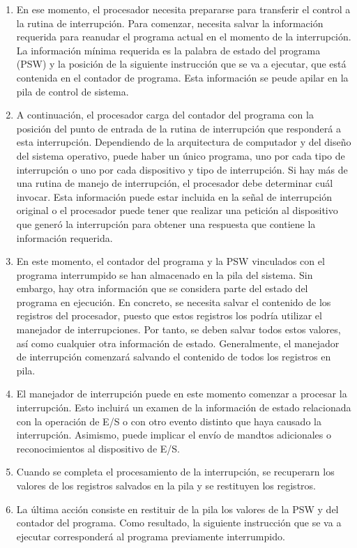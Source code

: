 \documentclass{article}
\begin{document}
\begin{itemize}
\begin{enumerate}
	\item En ese momento, el procesador necesita prepararse para transferir el control a la rutina de interrupción. Para comenzar, necesita salvar la información requerida para reanudar el programa actual en el momento de la interrupción. La información mínima requerida es la palabra de estado del programa (PSW) y la posición de la siguiente instrucción que se va a ejecutar, que está contenida en el contador de programa. Esta información se peude apilar en la pila de control de sistema.
	
	\item A continuación, el procesador carga del contador del programa con la posición del punto de entrada de la rutina de interrupción que responderá a esta interrupción. Dependiendo de la arquitectura de computador y del diseño del sistema operativo, puede haber un único programa, uno por cada tipo de interrupción o uno por cada dispositivo y tipo de interrupción. Si hay más de una rutina de manejo de interrupción, el procesador debe determinar cuál invocar. Esta información puede estar incluida en la señal de interrupción original o el procesador puede tener que realizar una petición al dispositivo que generó la interrupción para obtener una respuesta que contiene la información requerida.
	
	\item En este momento, el contador del programa y la PSW vinculados con el programa interrumpido se han almacenado en la pila del sistema. Sin embargo, hay otra información que se considera parte del estado del programa en ejecución. En concreto, se necesita salvar el contenido de los registros del procesador, puesto que estos registros los podría utilizar el manejador de interrupciones. Por tanto, se deben salvar todos estos valores, así como cualquier otra información de estado. Generalmente, el manejador de interrupción comenzará salvando el contenido de todos los registros en pila. 
	
	\item El manejador de interrupción puede en este momento comenzar a procesar la interrupción. Esto incluirá un examen de la información de estado relacionada con la operación de E/S o con otro evento distinto que haya causado la interrupción. Asimismo, puede implicar el envío de mandtos adicionales o reconocimientos al dispositivo de E/S.
	
	\item Cuando se completa el procesamiento de la interrupción, se recuperarn los valores de los registros salvados en la pila y se restituyen los registros.
	
	\item La última acción consiste en restituir de la pila los valores de la PSW y del contador del programa. Como resultado, la siguiente instrucción que se va a ejecutar corresponderá al programa previamente interrumpido.
	\end{enumerate}


\end{itemize}
\end{document}
